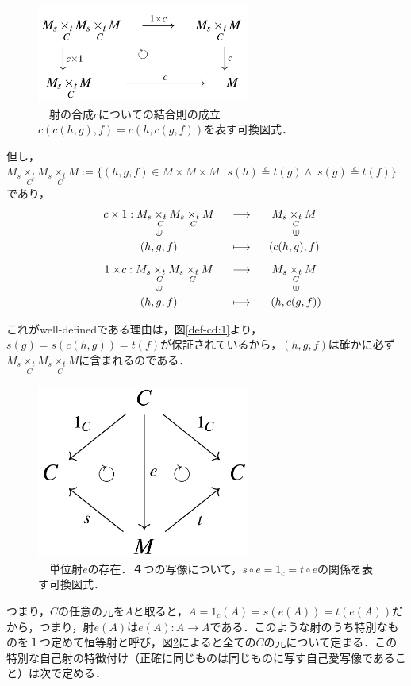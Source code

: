 \documentclass[uplatex, 12pt, a4paper, dvipdfmx]{jsarticle}
\begin{document}
\begin{figure}[ht] \begin{center}  \caption{\label{def-cd:2}　射の合成$c$についての結合則の成立$c(c(h,g),f)=c(h,c(g,f))$を表す可換図式．}
    \includegraphics[width=7cm]{cd-2.png}
\end{center}\end{figure}
但し，$M_s \underset{C}{\times_t}M_s \underset{C}{\times_t}M := \{ (h,g,f)\in M\times M\times M : \; s(h)\overset{c}{=} t(g) \wedge \; s(g) \overset{c}{=} t(f) \}$であり，$$\begin{array}{ccc}
        c\times1:M_s\underset{C}{\times_t}M_s\underset{C}{\times_t}M & \longrightarrow & M_s\underset{C}{\times_t}M \\
        \rotatebox{90}{$\in$} & & \rotatebox{90}{$\in$}\\
        (h,g,f) & \longmapsto & (c(h,g),f) \\[3mm]
        1\times \! c:M_s\underset{C}{\times_t}M_s\underset{C}{\times_t}M & \longrightarrow & M_s\underset{C}{\times_t}M \\
        \rotatebox{90}{$\in$} & & \rotatebox{90}{$\in$}\\
        (h,g,f) & \longmapsto & (h,c(g,f))
\end{array}$$

これがwell-definedである理由は，図\ref{def-cd:1}より，$s(g)=s(c(h,g))=t(f)$が保証されているから，$(h,g,f)$は確かに必ず$M_s \underset{C}{\times_t}M_s \underset{C}{\times_t}M$に含まれるのである．\\[3cm]

\begin{figure}[ht] \begin{center}  \caption{\label{def-cd:3}　単位射$e$の存在．４つの写像について，$s\circ e=1_c=t\circ e$の関係を表す可換図式．}
    \includegraphics[width=7cm]{cd-3.png}
\end{center}\end{figure}
つまり，$C$の任意の元を$A$と取ると，$A=1_c(A)=s(e(A))=t(e(A))$だから，つまり，射$e(A)$は$e(A):A\longrightarrow A$である．このような射のうち特別なものを１つ定めて恒等射と呼び，図\ref{def-cd:3}によると全ての$C$の元について定まる．この特別な自己射の特徴付け（正確に同じものは同じものに写す自己愛写像であること）は次で定める．
\end{document}
